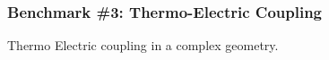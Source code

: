 \subsubsection{Benchmark \#3: Thermo-Electric Coupling}

Thermo Electric coupling in a complex geometry.




